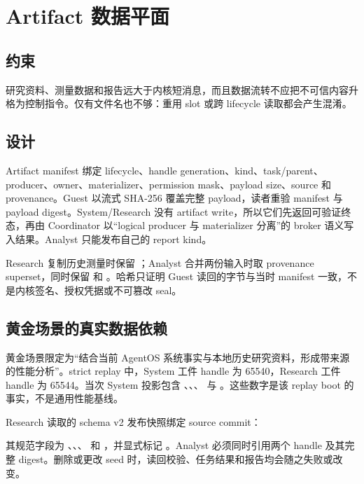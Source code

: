 \section{Artifact 数据平面}

\subsection{约束}

研究资料、测量数据和报告远大于内核短消息，而且数据流转不应把不可信内容升格为控制指令。仅有文件名也不够：重用 slot 或跨 lifecycle 读取都会产生混淆。

\subsection{设计}

Artifact manifest 绑定 lifecycle、handle generation、kind、task/parent、producer、owner、materializer、permission mask、payload size、source 和 provenance。Guest 以流式 SHA-256 覆盖完整 payload，读者重验 manifest 与 payload digest。System/Research 没有 artifact write，所以它们先返回可验证终态，再由 Coordinator 以“logical producer 与 materializer 分离”的 broker 语义写入结果。Analyst 只能发布自己的 report kind。

Research 复制历史测量时保留 ；Analyst 合并两份输入时取 provenance superset，同时保留  和 。哈希只证明 Guest 读回的字节与当时 manifest 一致，不是内核签名、授权凭据或不可篡改 seal。

\subsection{黄金场景的真实数据依赖}

黄金场景限定为“结合当前 AgentOS 系统事实与本地历史研究资料，形成带来源的性能分析”。strict replay 中，System 工件 handle 为 65540，Research 工件 handle 为 65544。当次 System 投影包含 、、、 与 。这些数字是该 replay boot 的事实，不是通用性能基线。

Research 读取的 schema v2 发布快照绑定 source commit：
\begin{center}\small{}\end{center}
其规范字段为 、、、 和 ，并显式标记 。Analyst 必须同时引用两个 handle 及其完整 digest。删除或更改 seed 时，读回校验、任务结果和报告均会随之失败或改变。

